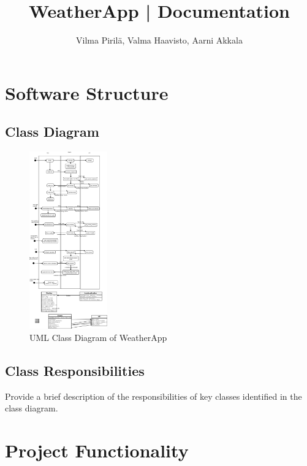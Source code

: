 \documentclass[a4paper,12pt]{article}
\begin{document}
\title{WeatherApp | Documentation}
\author{Vilma Pirilä, Valma Haavisto, Aarni Akkala}

\maketitle

\section{Software Structure}

\subsection{Class Diagram}

\begin{figure}[h]
    \centering
    \includegraphics[width=0.3\textwidth]{class_diagram.png}
    \caption{UML Class Diagram of WeatherApp}
    \label{fig:class_diagram}
\end{figure}

\FloatBarrier

\subsection{Class Responsibilities}

Provide a brief description of the responsibilities of key classes identified in the class diagram.

\section{Project Functionality}
\end{document}
